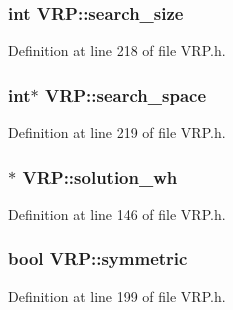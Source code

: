 \hypertarget{class_v_r_p_a30b72e877a153354bd5d8411c4dd5971}{
\subsubsection[{search\_\-size}]{\setlength{\rightskip}{0pt plus 5cm}int {\bf VRP::search\_\-size}}}
\label{class_v_r_p_a30b72e877a153354bd5d8411c4dd5971}


Definition at line 218 of file VRP.h.

\hypertarget{class_v_r_p_aff4f38285d931237cc1cb7006d1d4fcd}{
\subsubsection[{search\_\-space}]{\setlength{\rightskip}{0pt plus 5cm}int$\ast$ {\bf VRP::search\_\-space}}}
\label{class_v_r_p_aff4f38285d931237cc1cb7006d1d4fcd}


Definition at line 219 of file VRP.h.

\hypertarget{class_v_r_p_a858342764727f7bea3c965b4e9fb3dfa}{
\subsubsection[{solution\_\-wh}]{$\ast$ {\bf VRP::solution\_\-wh}}}
\label{class_v_r_p_a858342764727f7bea3c965b4e9fb3dfa}


Definition at line 146 of file VRP.h.

\hypertarget{class_v_r_p_afaf85ef2953e205d5eae0b1355ffe973}{
\subsubsection[{symmetric}]{\setlength{\rightskip}{0pt plus 5cm}bool {\bf VRP::symmetric}}}
\label{class_v_r_p_afaf85ef2953e205d5eae0b1355ffe973}


Definition at line 199 of file VRP.h.

